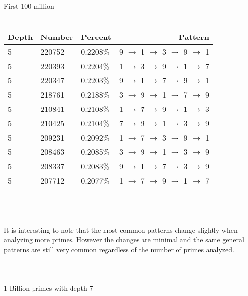 \documentclass[13pt]{article}
\begin{document}
\\\\\\First 100 million\\\\
\begin{tabular}{ l l l r }
  Depth & Number & Percent & Pattern \\
  \hline
  5 & 220752 & 0.2208\% & 9 $\rightarrow$ 1 $\rightarrow$ 3 $\rightarrow$ 9 $\rightarrow$ 1\\
  5 & 220393 & 0.2204\% & 1 $\rightarrow$ 3 $\rightarrow$ 9 $\rightarrow$ 1 $\rightarrow$ 7\\
  5 & 220347 & 0.2203\% & 9 $\rightarrow$ 1 $\rightarrow$ 7 $\rightarrow$ 9 $\rightarrow$ 1\\
  5 & 218761 & 0.2188\% & 3 $\rightarrow$ 9 $\rightarrow$ 1 $\rightarrow$ 7 $\rightarrow$ 9\\
  5 & 210841 & 0.2108\% & 1 $\rightarrow$ 7 $\rightarrow$ 9 $\rightarrow$ 1 $\rightarrow$ 3\\
  5 & 210425 & 0.2104\% & 7 $\rightarrow$ 9 $\rightarrow$ 1 $\rightarrow$ 3 $\rightarrow$ 9\\
  5 & 209231 & 0.2092\% & 1 $\rightarrow$ 7 $\rightarrow$ 3 $\rightarrow$ 9 $\rightarrow$ 1\\
  5 & 208463 & 0.2085\% & 3 $\rightarrow$ 9 $\rightarrow$ 1 $\rightarrow$ 3 $\rightarrow$ 9\\
  5 & 208337 & 0.2083\% & 9 $\rightarrow$ 1 $\rightarrow$ 7 $\rightarrow$ 3 $\rightarrow$ 9\\
  5 & 207712 & 0.2077\% & 1 $\rightarrow$ 7 $\rightarrow$ 9 $\rightarrow$ 1 $\rightarrow$ 7\\
\end{tabular}
 \\\\\\It is interesting to note that the most common patterns change slightly when analyzing more primes. However the changes are minimal and the same general patterns are still very common regardless of the number of primes analyzed.
\\\\\\\\1 Billion primes with depth 7\\\\
\end{document}
